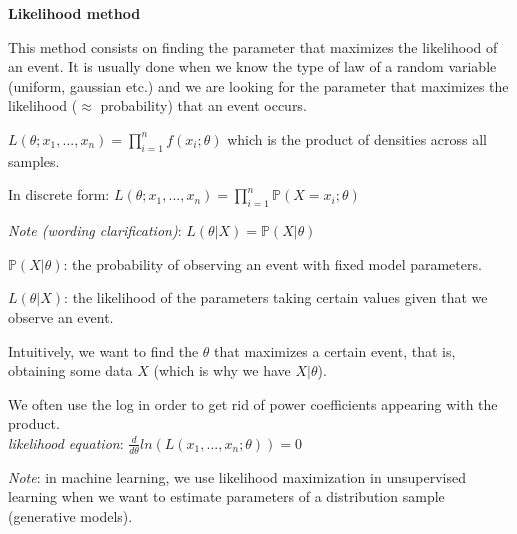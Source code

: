 {\fontsize{12pt}{22pt} \textbf{Likelihood method}\par}

\vspace{5mm}

This method consists on finding the parameter that maximizes the likelihood of an event. It is usually done when we know the type of law of a random variable (uniform, gaussian etc.) and we are looking for the parameter that maximizes the likelihood ($\approx$ probability) that an event occurs.

\vspace{5mm}

$L(\theta; x_1,...,x_n) = \prod_{i=1}^{n}f(x_i;\theta)$ which is the product of densities across all samples.

In discrete form: $L(\theta; x_1,...,x_n) = \prod_{i=1}^{n}\mathbb{P}(X = x_i; \theta)$


\vspace{5mm}

\textit{Note (wording clarification)}: $L(\theta | X) = \mathbb{P} (X | \theta)$

$\mathbb{P} (X | \theta)$: the probability of observing an event with fixed model parameters.

$L(\theta | X)$: the likelihood of the parameters taking certain values given that we observe an event.

\vspace{5mm}

Intuitively, we want to find the $\theta$ that maximizes a certain event, that is, obtaining some data $X$ (which is why we have $X | \theta$).

We often use the log in order to get rid of power coefficients appearing with the product. \\
\textit{likelihood equation}: $\frac{d}{d\theta}ln(L(x_1,...,x_n;\theta))=0$

\vspace{5mm}

\textit{Note}: in machine learning, we use likelihood maximization in unsupervised learning when we want to estimate parameters of a distribution sample (generative models).

\vspace{5mm}